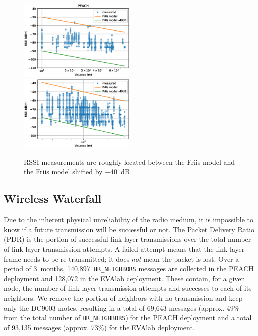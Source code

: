 \documentclass{elsarticle}
\newcommand{\HRNEIGHBORS}         {{\tt HR\_NEIGHBORS}\xspace}
\newcommand{\PEACHNUMHRNEIGHBORS} {140,897\xspace}
\newcommand{\EVANUMHRNEIGHBORS}   {128,072\xspace}
\begin{document}
\begin{figure}[h]
    \includegraphics[width=0.5\textwidth]{pister_hack_peach.eps}
    \includegraphics[width=0.5\textwidth]{pister_hack.eps}
    \caption{RSSI measurements are roughly located between the Friis model and the Friis model shifted by $-$40~dB.}
    \label{fig:pister_hack}
\end{figure}

\subsection{Wireless Waterfall}
\label{sec:waterfall}


Due to the inherent physical unreliability of the radio medium, it is impossible to know if a future transmission will be successful or not.
The Packet Delivery Ratio (PDR) is the portion of successful link-layer transmissions over the total number of link-layer transmission attempts.
A failed attempt means that the link-layer frame needs to be re-transmitted; it does \textit{not} mean the packet is lost.
Over a period of 3~months, \PEACHNUMHRNEIGHBORS~\HRNEIGHBORS messages are collected in the PEACH deployment and \EVANUMHRNEIGHBORS in the EVAlab deployment.
These contain, for a given node, the number of link-layer transmission attempts and successes to each of its neighbors.
We remove the portion of neighbors with no transmission and keep only the DC9003 motes, resulting in a total of 69,643 messages (approx. 49\% from the total number of \HRNEIGHBORS) for the PEACH deployment and a total of 93,135 messages (approx. 73\%) for the EVAlab deployment.
\end{document}
